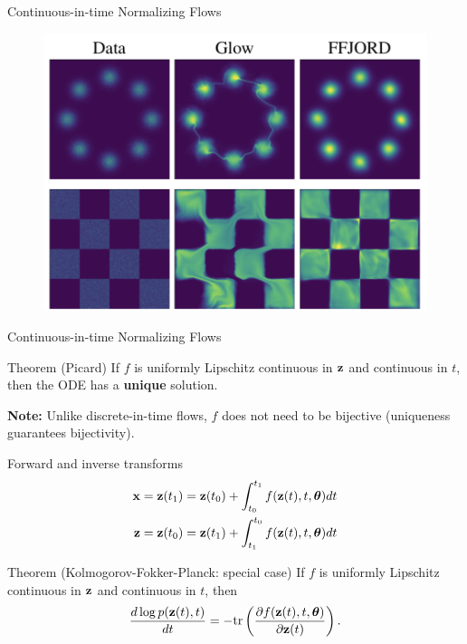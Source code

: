 \begin{frame}{Continuous-in-time Normalizing Flows}
\begin{minipage}[t]{0.6\columnwidth}
\begin{figure}
			\centering
			\includegraphics[width=0.8\linewidth]{figs/ffjord.png}
		\end{figure}
	\end{minipage}
\end{frame}
\begin{frame}{Continuous-in-time Normalizing Flows}
	\begin{block}{Theorem (Picard)}
		If $f$ is uniformly Lipschitz continuous in $\mathbf{z}$ and continuous in $t$, then the ODE has a \textbf{unique} solution.
	\end{block}
	\textbf{Note:} Unlike discrete-in-time flows, $f$ does not need to be bijective (uniqueness guarantees bijectivity).
	\begin{block}{Forward and inverse transforms}
		\vspace{-0.7cm}
		\begin{align*}
			\mathbf{x} &= \mathbf{z}(t_1) = \mathbf{z}(t_0) + \int_{t_0}^{t_1} f(\mathbf{z}(t), t, \boldsymbol{\theta}) dt \\
			\mathbf{z} &= \mathbf{z}(t_0) = \mathbf{z}(t_1) + \int_{t_1}^{t_0} f(\mathbf{z}(t), t, \boldsymbol{\theta}) dt
		\end{align*}
		\vspace{-0.7cm}
	\end{block}
	\begin{block}{Theorem (Kolmogorov-Fokker-Planck: special case)}
		If $f$ is uniformly Lipschitz continuous in $\mathbf{z}$ and continuous in $t$, then
		\[
			\frac{d \log p(\mathbf{z}(t), t)}{d t} = - \text{tr} \left( \frac{\partial f (\mathbf{z}(t), t, \boldsymbol{\theta})}{\partial \mathbf{z}(t)} \right).
		\]
	\end{block}
\end{frame}
